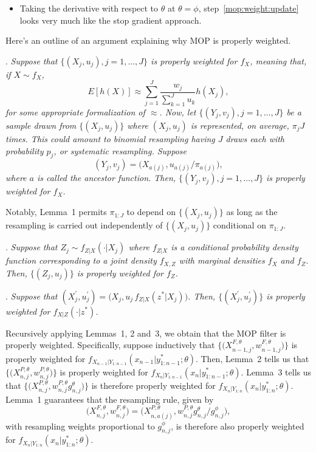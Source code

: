 \documentclass[12p]{article}
\begin{document}
\begin{itemize}
  \item Taking the derivative with respect to $\theta$ at $\theta=\phi$, step~\ref{mop:weight:update} looks very much like the stop gradient approach.

  \end{itemize}

Here's an outline of an argument explaining why MOP is properly weighted.

. {\it
Suppose that $\{(X_j,u_j),j=1,\dots,J\}$ is properly weighted for $f_X$, meaning that, if $X\sim f_X$,
\[
E[h(X)] \approx \sum_{j=1}^J \frac{w_j}{\sum_{k=1}^J u_k} h(X_j),
\]
for some appropriate formalization of $\approx$. Now, let $\{(Y_j,v_j),j=1,\dots,J\}$ be a sample drawn from $\{(X_j,u_j)\}$ where $(X_j,u_j)$ is represented, on average, $\pi_j J$ times. This could amount to binomial resampling having $J$ draws each with probability $p_j$, or systematic resampling. Suppose
\[
(Y_j,v_j) = \big(X_{a(j)},u_{a(j)}/\pi_{a(j)}\big),
\]
where $a$ is called the ancestor function. Then, $\{(Y_j,v_j),j=1,\dots,J\}$ is properly weighted for $f_X$.
}

Notably, Lemma~1 permits $\pi_{1:J}$ to depend on $\{(X_j,u_j)\}$ as long as the resampling is carried out independently of $\{(X_j,u_j)\}$ conditional on $\pi_{1:J}$.

. {\it
  Suppose that $Z_j \sim f_{Z|X}(\cdot | X_j)$ where $f_{Z|X}$ is a conditional probability density function corresponding to a joint density $f_{X,Z}$ with marginal densities $f_X$ and $f_Z$. Then, $\{(Z_j,u_j)\}$ is properly weighted for $f_Z$.
}

. {\it
Suppose that $(X^\prime_j,u^\prime_j) = \big(X_j,u_j\, f_{Z|X}(z^*|X_j)\big)$. Then, $\{(X^\prime_j,u^\prime_j)\}$ is properly weighted for $f_{X|Z}(\cdot | z^*)$.
}

Recursively applying Lemmas~1, 2 and~3, we obtain that 
the MOP filter is properly weighted.
Specifically, suppose inductively that $\big\{\big(X^{F,\theta}_{n-1,j},w^{F,\theta}_{n-1,j}\big)\big\}$ is properly weighted for $f_{X_{n-1}|Y_{1:n-1}}(x_{n-1}|y^*_{1:n-1};\theta)$.
Then, Lemma~2 tells us that $\big\{\big(X^{P,\theta}_{n,j},w^{P,\theta}_{n,j}\big)\big\}$ is properly weighted for $f_{X_{n}|Y_{1:n-1}}(x_{n}|y^*_{1:n-1};\theta)$.
Lemma~3 tells us that $\big\{\big(X^{P,\theta}_{n,j},w^{P,\theta}_{n,j} g^\theta_{n,j} \big)\big\}$ is therefore properly weighted for  $f_{X_{n}|Y_{1:n}}(x_{n}|y^*_{1:n};\theta)$.
Lemma~1 guarantees that the resampling rule, given by 
\[
\big(X^{F,\theta}_{n,j},w^{F,\theta}_{n,j}\big) = \big(X^{P,\theta}_{n,a(j)}, w^{P,\theta}_{n,j} g^\theta_{n,j}\big/ g^\phi_{n,j}\big),
\]
with resampling weights proportional to $g^\phi_{n,j}$, is therefore also properly weighted for $f_{X_{n}|Y_{1:n}}(x_{n}|y^*_{1:n};\theta)$.
\end{document}
